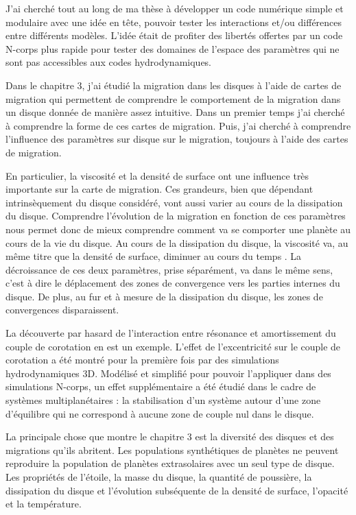 J'ai cherché tout au long de ma thèse à développer un code numérique simple et modulaire avec une idée en tête, pouvoir tester les interactions et/ou différences entre différents modèles. L'idée était de profiter des libertés offertes par un code N-corps plus rapide pour tester des domaines de l'espace des paramètres qui ne sont pas accessibles aux codes hydrodynamiques. 

\bigskip

Dans le chapitre 3, j'ai étudié la migration dans les disques à l'aide de cartes de migration qui permettent de comprendre le comportement de la migration dans un disque donnée de manière assez intuitive. Dans un premier temps j'ai cherché à comprendre la forme de ces cartes de migration. Puis, j'ai cherché à comprendre l'influence des paramètres sur disque sur le migration, toujours à l'aide des cartes de migration. 

En particulier, la viscosité et la densité de surface ont une influence très importante sur la carte de migration. Ces grandeurs, bien que dépendant intrinsèquement du disque considéré, vont aussi varier au cours de la dissipation du disque. Comprendre l'évolution de la migration en fonction de ces paramètres nous permet donc de mieux comprendre comment va se comporter une planète au cours de la vie du disque. Au cours de la dissipation du disque, la viscosité va, au même titre que la densité de surface, diminuer au cours du temps \citep[Fig. 16]{guilloteau2011dual}. La décroissance de ces deux paramètres, prise séparément, va dans le même sens, c'est à dire le déplacement des zones de convergence vers les parties internes du disque. De plus, au fur et à mesure de la dissipation du disque, les zones de convergences disparaissent.

La découverte par hasard de l'interaction entre résonance et amortissement du couple de corotation en est un exemple. L'effet de l'excentricité sur le couple de corotation a été montré pour la première fois par des simulations hydrodynamiques 3D\citep{bitsch2010orbital}. Modélisé et simplifié pour pouvoir l'appliquer dans des simulations N-corps, un effet supplémentaire a été étudié dans le cadre de systèmes multiplanétaires : la stabilisation d'un système autour d'une zone d'équilibre qui ne correspond à aucune zone de couple nul dans le disque. 

\bigskip

La principale chose que montre le chapitre 3 est la diversité des disques et des migrations qu'ils abritent. Les populations synthétiques de planètes ne peuvent reproduire la population de planètes extrasolaires avec un seul type de disque. Les propriétés de l'étoile, la masse du disque, la quantité de poussière, la dissipation du disque et l'évolution subséquente de la densité de surface, l'opacité et la température. 

